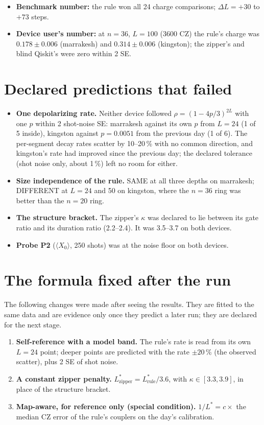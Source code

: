 \documentclass[11pt]{article}
\begin{document}
\begin{itemize}
\item \textbf{Benchmark number:} the rule won all 24 charge comparisons; $\Delta L=+30$ to $+73$ steps.
\item \textbf{Device user's number:} at $n=36$, $L=100$ (3600 CZ) the rule's charge was $0.178\pm0.006$ (marrakesh)
  and $0.314\pm0.006$ (kingston); the zipper's and blind Qiskit's were zero within 2 SE.
\end{itemize}

\section{Declared predictions that failed}
\begin{itemize}
\item \textbf{One depolarizing rate.} Neither device followed $\rho=(1-4p/3)^{2L}$ with one $p$ within 2 shot-noise
  SE: marrakesh against its own $p$ from $L=24$ (1 of 5 inside), kingston against $p=0.0051$ from the previous day
  (1 of 6). The per-segment decay rates scatter by 10--20\,\% with no common direction, and kingston's rate had
  improved since the previous day; the declared tolerance (shot noise only, about 1\,\%) left no room for either.
\item \textbf{Size independence of the rule.} SAME at all three depths on marrakesh; DIFFERENT at $L=24$ and 50 on
  kingston, where the $n=36$ ring was better than the $n=20$ ring.
\item \textbf{The structure bracket.} The zipper's $\kappa$ was declared to lie between its gate ratio and its
  duration ratio (2.2--2.4). It was 3.5--3.7 on both devices.
\item \textbf{Probe P2} ($\langle X_0\rangle$, 250 shots) was at the noise floor on both devices.
\end{itemize}

\section{The formula fixed after the run}\label{sec:fixed}
The following changes were made after seeing the results. They are fitted to the same data and are evidence only once
they predict a later run; they are declared for the next stage.
\begin{enumerate}
\item \textbf{Self-reference with a model band.} The rule's rate is read from its own $L=24$ point; deeper points are
  predicted with the rate $\pm20$\,\% (the observed scatter), plus 2 SE of shot noise.
\item \textbf{A constant zipper penalty.} $L^*_{\text{zipper}}=L^*_{\text{rule}}/3.6$, with $\kappa\in[3.3,3.9]$,
  in place of the structure bracket.
\item \textbf{Map-aware, for reference only (special condition).} $1/L^*=c\times$ the median CZ error of the rule's
  couplers on the day's calibration.
\end{enumerate}
\end{document}
